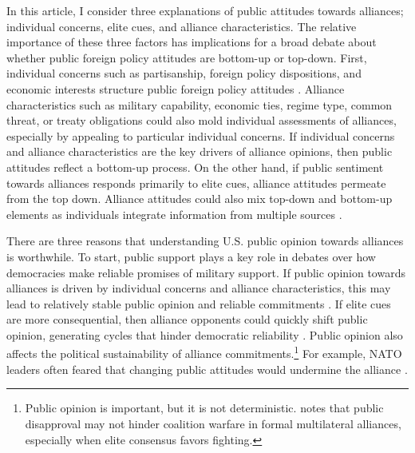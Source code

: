 \documentclass[12pt]{article}
\begin{document}
In this article, I consider three explanations of public attitudes towards alliances; individual concerns, elite cues, and alliance characteristics.
The relative importance of these three factors has implications for a broad debate about whether public foreign policy attitudes are bottom-up or top-down. 
First, individual concerns such as partisanship, foreign policy dispositions, and economic interests structure public foreign policy attitudes \citep{KertzerZeitzoff2017}.
Alliance characteristics such as military capability, economic ties, regime type, common threat, or treaty obligations could also mold individual assessments of alliances, especially by appealing to particular individual concerns. 
If individual concerns and alliance characteristics are the key drivers of alliance opinions, then public attitudes reflect a bottom-up process. 
On the other hand, if public sentiment towards alliances responds primarily to elite cues, alliance attitudes permeate from the top down.
Alliance attitudes could also mix top-down and bottom-up elements as individuals integrate information from multiple sources \citep{PageShapiro1992}.  


There are three reasons that understanding U.S. public opinion towards alliances is worthwhile. 
To start, public support plays a key role in debates over how democracies make reliable promises of military support. 
If public opinion towards alliances is driven by individual concerns and alliance characteristics, this may lead to relatively stable public opinion and reliable commitments \citep{Gaubatz1996}.
If elite cues are more consequential, then alliance opponents could quickly shift public opinion, generating cycles that hinder democratic reliability \citep{GartzkeGleditsch2004}.
Public opinion also affects the political sustainability of alliance commitments.\footnote{Public opinion is important, but it is not deterministic. \citet{Kreps2010} notes that public disapproval may not hinder coalition warfare in formal multilateral alliances, especially when elite consensus favors fighting.}
For example, NATO leaders often feared that changing public attitudes would undermine the alliance \citep{Sayle2019}.   
\end{document}
